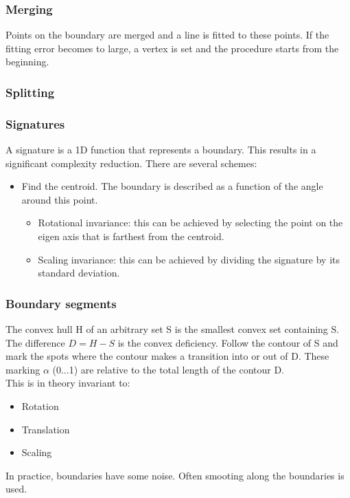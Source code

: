 \subsubsection{Merging}
Points on the boundary are merged and a line is fitted to these points. If the fitting error becomes to large, a vertex is set and the procedure starts from the beginning.\\
\subsubsection{Splitting}
\subsubsection{Signatures}
A signature is a 1D function that represents a boundary. This results in a significant complexity reduction. There are several schemes:\\
\begin{itemize}
\item Find the centroid. The boundary is described as a function of the angle around this point.
\begin{itemize}
\item Rotational invariance: this can be achieved by selecting the point on the eigen axis that is farthest from the centroid.
\item Scaling invariance: this can be achieved by dividing the signature by its standard deviation.
\end{itemize}
\end{itemize}
\subsubsection{Boundary segments}
The convex hull H of an arbitrary set S is the smallest convex set containing S. The difference $D=H-S$ is the convex deficiency. Follow the contour of S and mark the spots where the contour makes a transition into or out of D. These marking $\alpha$ (0...1) are relative to the total length of the contour D.\\
This is in theory invariant to:\\
\begin{itemize}
\item Rotation
\item Translation
\item Scaling
\end{itemize}
In practice, boundaries have some noise. Often smooting along the boundaries is used.\\

